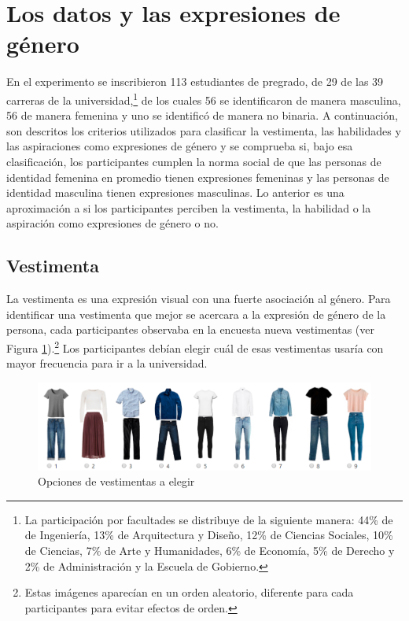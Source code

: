 \section{Los datos y las expresiones de género}
En el experimento se inscribieron 113 estudiantes de pregrado, de 29 de las 39 carreras de la universidad,\footnote{La participación por facultades se distribuye de la siguiente manera: 44\% de de Ingeniería, 13\% de Arquitectura y Diseño, 12\% de Ciencias Sociales, 10\% de Ciencias, 7\% de Arte y Humanidades, 6\% de Economía, 5\% de Derecho y 2\% de Administración y la Escuela de Gobierno.} de los cuales 56 se identificaron de manera masculina, 56 de manera femenina y uno se identificó de manera no binaria. A continuación, son descritos los criterios utilizados para clasificar la vestimenta, las habilidades y las aspiraciones como expresiones de género y se comprueba si, bajo esa clasificación, los participantes cumplen la norma social de que las personas de identidad femenina en promedio tienen expresiones femeninas y las personas de identidad masculina tienen expresiones masculinas. Lo anterior es una aproximación a si los participantes perciben la vestimenta, la habilidad o la aspiración como expresiones de género o no.

\subsection{Vestimenta} La vestimenta es una expresión visual con una fuerte asociación al género. Para identificar una vestimenta que mejor se acercara a la expresión de género de la persona, cada participantes observaba en la encuesta nueva vestimentas (ver Figura \ref{fig:vestimentas}).\footnote{Estas imágenes aparecían en un orden aleatorio, diferente para cada participantes para evitar efectos de orden.} Los participantes debían elegir cuál de esas vestimentas usaría con mayor frecuencia para ir a la universidad.

\begin{figure}[htbp]
    \centering
    \includegraphics[width=14cm]{Images/vestimentas.png}
    \caption{Opciones de vestimentas a elegir}
    \label{fig:vestimentas}
    \begin{singlespace}
    \end{singlespace}
\end{figure}

